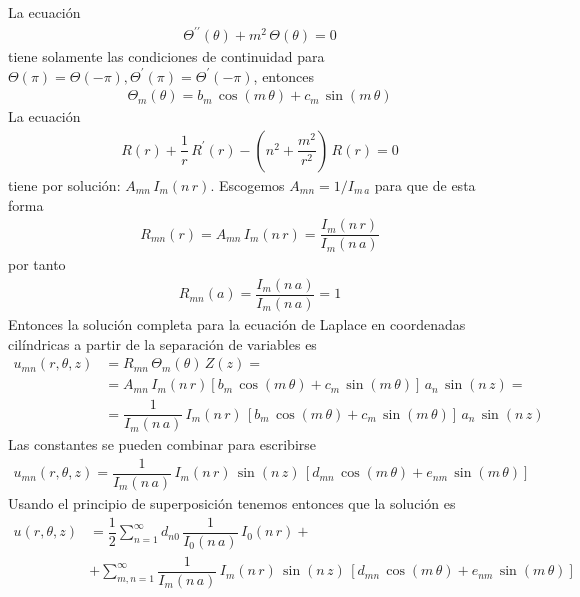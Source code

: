 La ecuación
\begin{align*}
\Theta^{\prime \prime} (\theta) + m^{2} \, \Theta (\theta) = 0
\end{align*}
tiene solamente las condiciones de continuidad para $\Theta (\pi) = \Theta (- \pi), \Theta^{\prime} (\pi) = \Theta^{\prime} (- \pi)$, entonces
\begin{align*}
\Theta_{m} (\theta) = b_{m} \, \cos (m \, \theta) + c_{m} \, \sin (m \, \theta)
\end{align*}
La ecuación
\begin{align*}
R (r) + \dfrac{1}{r} \, R^{\prime} (r) - \left( n^{2} + \dfrac{m^{2}}{r^{2}} \right) \, R (r) = 0
\end{align*}
tiene por solución: $A_{mn} \, I_{m} ( n \, r)$. Escogemos $A_{mn} = 1 / I_{m \, a}$ para que de esta forma
\begin{align*}
R_{mn} (r) = A_{mn} \, I_{m} ( n \, r) = \dfrac{I_{m} (n \, r)}{I_{m} (n \, a)}
\end{align*}
por tanto
\begin{align*}
R_{mn} (a) = \dfrac{I_{m} (n \, a)}{I_{m} (n \, a)} = 1
\end{align*}
Entonces la solución completa para la ecuación de Laplace en coordenadas cilíndricas a partir de la separación de variables es
\begin{align*}
u_{mn} (r, \theta, z) &= R_{mn} \, \Theta_{m} (\theta) \, Z(z) = \\[0.5em]
&= A_{mn} \, I_{m} ( n \, r) \left[ b_{m} \, \cos (m \, \theta) + c_{m} \, \sin (m \, \theta) \right] \, a_{n} \, \sin ( n \, z) = \\[0.5em]
&= \dfrac{1}{I_{m} (n \, a)} \, I_{m} (n \, r) \, \left[ b_{m} \, \cos (m \, \theta) + c_{m} \, \sin (m \, \theta) \right] \, a_{n} \, \sin ( n \, z)
\end{align*}
Las constantes se pueden combinar para escribirse
\begin{align*}
u_{mn} (r, \theta, z) = \dfrac{1}{I_{m} (n \, a)} \, I_{m} (n \, r) \, \sin (n \, z) \, \left[ d_{mn} \, \cos (m \, \theta) + e_{nm} \, \sin (m \, \theta) \right]
\end{align*}
Usando el principio de superposición tenemos entonces que la solución es
\begin{align*}
u (r, \theta, z) &= \dfrac{1}{2} \sum_{n=1}^{\infty} d_{n0} \, \dfrac{1}{I_{0} (n \, a)} \, I_{0} (n \, r) + \\[0.5em]
&+ \sum_{m,n=1}^{\infty} \dfrac{1}{I_{m} (n \, a)} \, I_{m} (n \, r) \, \sin (n \, z) \, \left[ d_{mn} \, \cos (m \, \theta) + e_{nm} \, \sin (m \, \theta) \right]
\end{align*}
